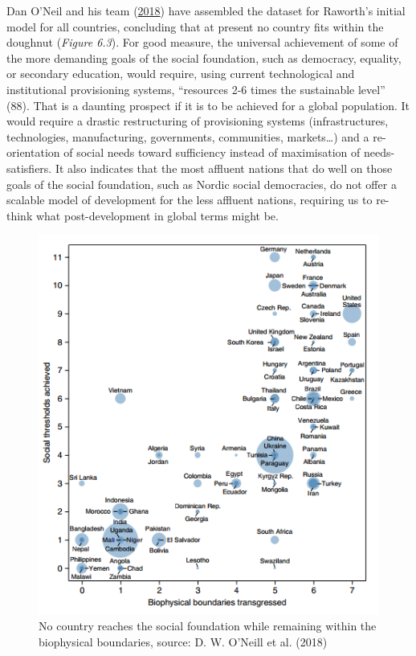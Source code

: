 \documentclass[a4paper, nobind]{templates/ociamthesis}
\begin{document}
Dan O'Neil and his team (\protect\hyperlink{ref-oneill_good_2018}{2018}) have assembled the dataset for Raworth's initial model for all countries, concluding that at present no country fits within the doughnut (\emph{Figure 6.3}). For good measure, the universal achievement of some of the more demanding goals of the social foundation, such as democracy, equality, or secondary education, would require, using current technological and institutional provisioning systems, ``resources 2-6 times the sustainable level'' (88). That is a daunting prospect if it is to be achieved for a global population. It would require a drastic restructuring of provisioning systems (infrastructures, technologies, manufacturing, governments, communities, markets\ldots) and a re-orientation of social needs toward sufficiency instead of maximisation of needs-satisfiers. It also indicates that the most affluent nations that do well on those goals of the social foundation, such as Nordic social democracies, do not offer a scalable model of development for the less affluent nations, requiring us to re-think what post-development in global terms might be.

\begin{figure}
\includegraphics[width=1\linewidth]{./figures/oneill_countries} \caption[No country reaches the social foundation while remaining within the biophysical boundaries]{No country reaches the social foundation while remaining within the biophysical boundaries, source: D. W. O’Neill et al. (2018)}\label{fig:unnamed-chunk-7}
\end{figure}
\end{document}
